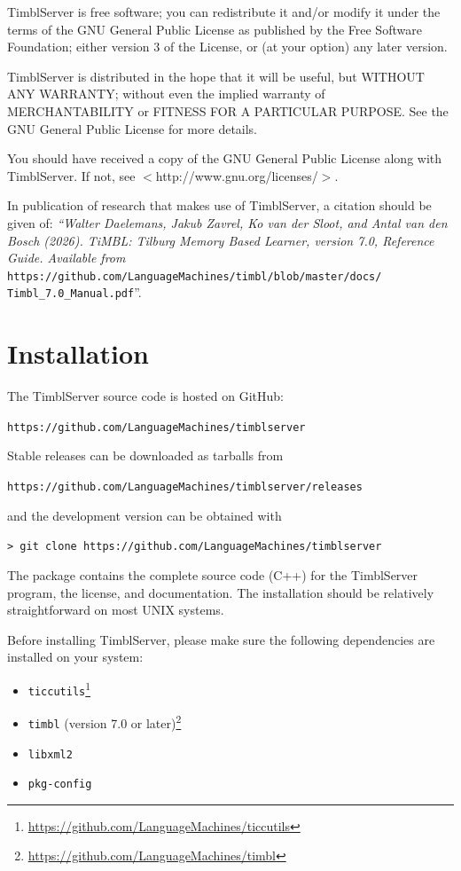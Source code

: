 \documentclass{report}
\begin{document}
TimblServer is free software; you can redistribute it and/or modify it
under the terms of the GNU General Public License as published by the
Free Software Foundation; either version 3 of the License, or (at your
option) any later version.

TimblServer is distributed in the hope that it will be useful, but
WITHOUT ANY WARRANTY; without even the implied warranty of
MERCHANTABILITY or FITNESS FOR A PARTICULAR PURPOSE.  See the GNU
General Public License for more details.

You should have received a copy of the GNU General Public License
along with TimblServer.  If not, see
$<$http://www.gnu.org/licenses/$>$.

In publication of research that makes use of TimblServer, a citation
should be given of: {\em ``Walter Daelemans, Jakub Zavrel, Ko van der
  Sloot, and Antal van den Bosch (2026). TiMBL: Tilburg Memory Based
  Learner, version 7.0, Reference Guide. Available from} \\
{\tt https://github.com/LanguageMachines/timbl/blob/master/docs/}\\
{\tt Timbl\_7.0\_Manual.pdf}''.

\pagestyle{headings}

\chapter{Installation}

The TimblServer source code is hosted on GitHub:

{\tt https://github.com/LanguageMachines/timblserver}

Stable releases can be downloaded as tarballs from

{\tt https://github.com/LanguageMachines/timblserver/releases}

and the development version can be obtained with

{\tt > git clone https://github.com/LanguageMachines/timblserver}

The package contains the complete source code (C++) for the
TimblServer program, the license, and documentation. The installation
should be relatively straightforward on most UNIX systems.

Before installing TimblServer, please make sure the following
dependencies are installed on your system:

\begin{itemize}
\item {\tt ticcutils}\footnote{\url{https://github.com/LanguageMachines/ticcutils}}
\item {\tt timbl} (version 7.0 or later)\footnote{\url{https://github.com/LanguageMachines/timbl}}
\item {\tt libxml2}
\item {\tt pkg-config}
\end{itemize}
\end{document}
